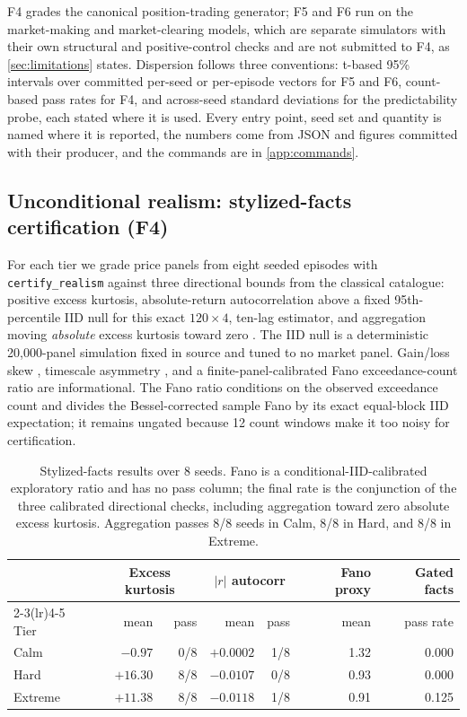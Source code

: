 F4 grades the canonical position-trading generator; F5 and F6 run on the market-making and market-clearing models, which are separate simulators with their own structural and positive-control checks and are not submitted to F4, as \cref{sec:limitations} states. Dispersion follows three conventions: t-based 95\% intervals over committed per-seed or per-episode vectors for F5 and F6, count-based pass rates for F4, and across-seed standard deviations for the predictability probe, each stated where it is used. Every entry point, seed set and quantity is named where it is reported, the numbers come from JSON and figures committed with their producer, and the commands are in \cref{app:commands}.

\subsection{Unconditional realism: stylized-facts certification (F4)}\label{sec:f4}

For each tier we grade price panels from eight seeded episodes with \texttt{certify\_realism} against three directional bounds from the classical catalogue: positive excess kurtosis, absolute-return autocorrelation above a fixed 95th-percentile IID null for this exact $120\times4$, ten-lag estimator, and aggregation moving \emph{absolute} excess kurtosis toward zero \citep{cont2001empirical}. The IID null is a deterministic 20{,}000-panel simulation fixed in source and tuned to no market panel. Gain/loss skew \citep{cont2001empirical}, timescale asymmetry \citep{zumbach2009time}, and a finite-panel-calibrated Fano exceedance-count ratio are informational. The Fano ratio conditions on the observed exceedance count and divides the Bessel-corrected sample Fano by its exact equal-block IID expectation; it remains ungated because 12 count windows make it too noisy for certification.

\begin{table}[t]
\centering
\caption{Stylized-facts results over 8 seeds. Fano is a conditional-IID-calibrated exploratory ratio and has no pass column; the final rate is the conjunction of the three calibrated directional checks, including aggregation toward zero absolute excess kurtosis. Aggregation passes 8/8 seeds in Calm, 8/8 in Hard, and 8/8 in Extreme.}
\label{tab:f4}
\small
\setlength{\tabcolsep}{5pt}
\begin{tabular}{l rr rr r r}
\toprule
 & \multicolumn{2}{c}{Excess kurtosis} & \multicolumn{2}{c}{$|r|$ autocorr} & {Fano proxy} & {Gated facts} \\
\cmidrule(lr){2-3}\cmidrule(lr){4-5}
Tier & mean & pass & mean & pass & mean & pass rate \\
\midrule
Calm & $-0.97$ & 0/8 & $+0.0002$ & 1/8 & 1.32 & 0.000 \\
Hard & $+16.30$ & 8/8 & $-0.0107$ & 0/8 & 0.93 & 0.000 \\
Extreme & $+11.38$ & 8/8 & $-0.0118$ & 1/8 & 0.91 & 0.125 \\
\bottomrule
\end{tabular}
\end{table}

